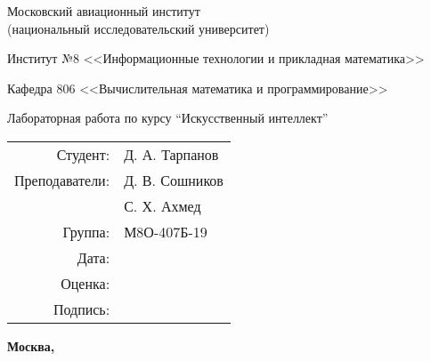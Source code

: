 \begin{titlepage}
\begin{center}
\bfseries

{\Large Московский авиационный институт \\ (национальный исследовательский университет)

}

\vspace{48pt}

{\large Институт №8 <<Информационные технологии и прикладная математика>>
}

\vspace{36pt}

{\large Кафедра 806 <<Вычислительная математика и программирование>>

}

\vspace{48pt}

Лабораторная работа  по курсу \enquote{Искусственный интеллект}

\end{center}

\vspace{72pt}

\begin{flushright}
\begin{tabular}{rl}
Студент: & Д. А. Тарпанов \\
Преподаватели: & Д. В. Сошников\\
& С. Х. Ахмед\\
Группа: & М8О-407Б-19 \\
Дата: & \\
Оценка: & \\
Подпись: & \\
\end{tabular}
\end{flushright}

\vfill

\begin{center}
\bfseries
Москва, \the\year
\end{center}
\end{titlepage}

\pagebreak
